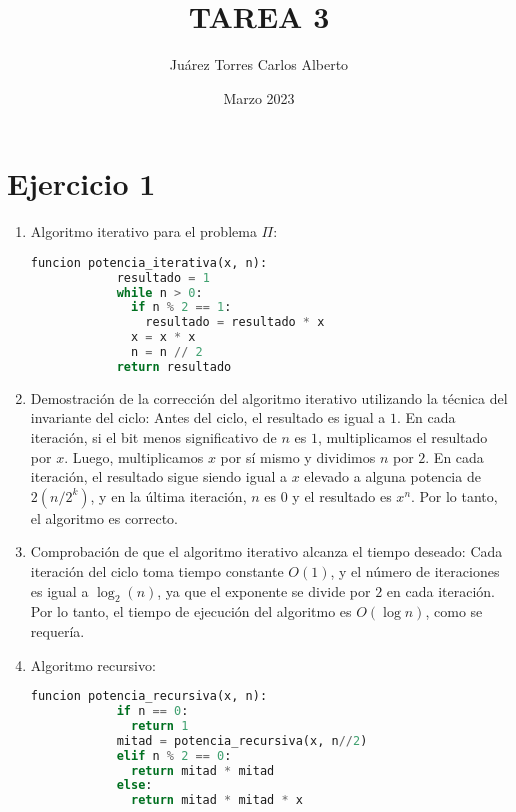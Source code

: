 \documentclass{article}
\title{TAREA 3}
\author{Juárez Torres Carlos Alberto}
\date{Marzo 2023}
\begin{document}
\maketitle

\section{Ejercicio 1} 

  \begin{enumerate}
    \item Algoritmo iterativo para el problema $\Pi$:

    \begin{lstlisting}[language=python]
          funcion potencia_iterativa(x, n):
            resultado = 1
            while n > 0:
              if n % 2 == 1:
                resultado = resultado * x
              x = x * x
              n = n // 2
            return resultado
    \end{lstlisting}

  \item 
    Demostración de la corrección del algoritmo iterativo utilizando la técnica del invariante del ciclo:
      Antes del ciclo, el resultado es igual a $1$. En cada iteración, si el bit menos significativo de $n$ es $1$, multiplicamos el resultado por $x$.
      Luego, multiplicamos $x$ por sí mismo y dividimos $n$ por $2$. En cada iteración, el resultado sigue siendo igual a $x$ elevado a alguna potencia de 
      $2 (n/2^k)$, y en la última iteración, $n$ es $0$ y el resultado es $x^n$. Por lo tanto, el algoritmo es correcto.


  \item Comprobación de que el algoritmo iterativo alcanza el tiempo deseado:
       Cada iteración del ciclo toma tiempo constante $O(1)$, y el número de iteraciones es igual a $\log_2(n)$, 
        ya que el exponente se divide por $2$ en cada iteración. Por lo tanto, el tiempo de ejecución del algoritmo es 
        $O(\log n)$, como se requería.
       

\newpage
  \item Algoritmo recursivo:
        \begin{lstlisting}[language=python]
          funcion potencia_recursiva(x, n):
            if n == 0:
              return 1
            mitad = potencia_recursiva(x, n//2)
            elif n % 2 == 0:
              return mitad * mitad
            else:
              return mitad * mitad * x


        \end{lstlisting}


\end{enumerate}
\end{document}
